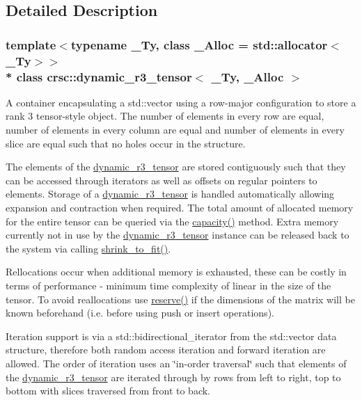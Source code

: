 \subsection{Detailed Description}
\subsubsection*{template$<$typename \+\_\+\+Ty, class \+\_\+\+Alloc = std\+::allocator$<$\+\_\+\+Ty$>$$>$\\*
class crsc\+::dynamic\+\_\+r3\+\_\+tensor$<$ \+\_\+\+Ty, \+\_\+\+Alloc $>$}

A container encapsulating a {\ttfamily std\+::vector} using a row-\/major configuration to store a rank 3 tensor-\/style object. The number of elements in every row are equal, number of elements in every column are equal and number of elements in every slice are equal such that no holes occur in the structure. 

The elements of the {\ttfamily \hyperlink{classcrsc_1_1dynamic__r3__tensor}{dynamic\+\_\+r3\+\_\+tensor}} are stored contiguously such that they can be accessed through iterators as well as offsets on regular pointers to elements. Storage of a {\ttfamily \hyperlink{classcrsc_1_1dynamic__r3__tensor}{dynamic\+\_\+r3\+\_\+tensor}} is handled automatically allowing expansion and contraction when required. The total amount of allocated memory for the entire tensor can be queried via the {\ttfamily \hyperlink{classcrsc_1_1dynamic__r3__tensor_a09c2151057626ff10816e55919a39029}{capacity()}} method. Extra memory currently not in use by the {\ttfamily \hyperlink{classcrsc_1_1dynamic__r3__tensor}{dynamic\+\_\+r3\+\_\+tensor}} instance can be released back to the system via calling {\ttfamily \hyperlink{classcrsc_1_1dynamic__r3__tensor_a6dc4799f28a64c673e3705b395fc5279}{shrink\+\_\+to\+\_\+fit()}}.

Rellocations occur when additional memory is exhausted, these can be costly in terms of performance -\/ minimum time complexity of linear in the size of the tensor. To avoid reallocations use {\ttfamily \hyperlink{classcrsc_1_1dynamic__r3__tensor_a69fafdea7746344c3769ce3fcee1ab14}{reserve()}} if the dimensions of the matrix will be known beforehand (i.\+e. before using {\ttfamily push} or {\ttfamily insert} operations).

Iteration support is via a {\ttfamily std\+::bidirectional\+\_\+iterator} from the {\ttfamily std\+::vector} data structure, therefore both random access iteration and forward iteration are allowed. The order of iteration uses an \char`\"{}in-\/order traversal\char`\"{} such that elements of the {\ttfamily \hyperlink{classcrsc_1_1dynamic__r3__tensor}{dynamic\+\_\+r3\+\_\+tensor}} are iterated through by rows from left to right, top to bottom with slices traversed from front to back.


